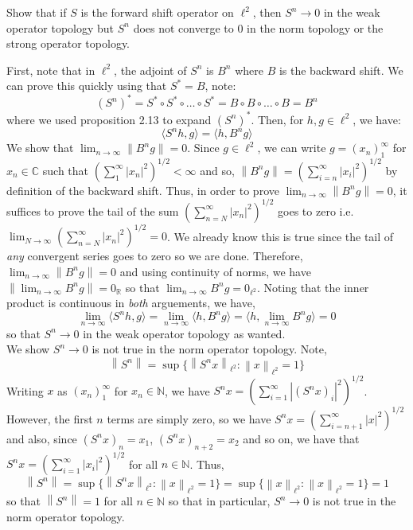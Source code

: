 \documentclass{article}
\newcommand{\norm}[1]{\left\lVert#1\right\rVert}
\begin{document}
    \newpage
    \begin{Exercise}
        Show that if $S$ is the forward shift operator on $\ell^2$, then $S^n\to 0$ in the weak operator topology but $S^n$ does not converge to
        0 in the norm topology or the strong operator topology.
    \end{Exercise}

    \begin{Answer}
        First, note that in $\ell^2$, the adjoint of $S^n$ is $B^n$ where $B$ is the backward shift. 
        We can prove this quickly using that $S^* = B$, note:
        \[ (S^n)^* = S^* \circ S^* \circ \hdots \circ S^* = B \circ B \circ \hdots \circ B = B^n \]
        where we used proposition 2.13 to expand $(S^n)^*$. Then, for $h,g\in\ell^2$, we have:
        \[ \langle S^n h, g\rangle = \langle h, B^n g\rangle \]
        We show that $\lim_{n\to\infty} \norm{B^n g} = 0$. Since $g\in\ell^2$, we can write $g = (x_n)_1^{\infty}$ for $x_n\in\mathbb{C}$
        such that $(\sum_1^{\infty} |x_n|^2)^{1/2} < \infty$ and so, $\norm{B^n g} = (\sum_{i=n}^{\infty} |x_i|^2)^{1/2}$ by definition
        of the backward shift. Thus, in order to prove $\lim_{n\to\infty} \norm{B^ng} = 0$, it suffices to prove the tail of the sum
        $(\sum_{n=N}^{\infty} |x_n|^2)^{1/2}$ goes to zero i.e. $\lim_{N\to\infty} (\sum_{n=N}^{\infty} |x_n|^2)^{1/2} = 0$. 
        We already know this is true since the tail of \textit{any} convergent series goes to zero so we are done. Therefore,
        $\lim_{n\to\infty} \norm{B^n g} = 0$ and using continuity of norms, we have $\norm{\lim_{n\to\infty} B^n g} = 0_{\mathbb{R}}$ so that
        $\lim_{n\to\infty} B^n g = 0_{\ell^2}$. Noting that the inner product is continuous in \textit{both} arguements, we have,
        \[ \lim_{n\to\infty} \langle S^nh,g\rangle = \lim_{n\to\infty} \langle h,B^ng\rangle = \langle h,\lim_{n\to\infty} B^n g\rangle = 0 \]
        so that $S^n \to 0$ in the weak operator topology as wanted.\\

        We show $S^n \to 0$ is not true in the norm operator topology. Note,
        \[ \norm{S^n} = \sup\{\norm{S^n x}_{\ell^2}: \norm{x}_{\ell^2} = 1\} \]
        Writing $x$ as $(x_n)_1^{\infty}$ for $x_n\in\mathbb{N}$, we have $S^nx = (\sum_{i=1}^{\infty} |(S^nx)_i|^2)^{1/2}$. However, the first
        $n$ terms are simply zero, so we have $S^n x = (\sum_{i=n+1}^{\infty} |x|^2)^{1/2}$ and also, since $(S^n x)_n = x_1$,
        $(S^n x)_{n+2} = x_2$ and so on, we have that $S^n x = (\sum_{i=1}^{\infty} |x_i|^2)^{1/2}$ for all $n\in\mathbb{N}$. Thus,
        \[ \norm{S^n} = \sup\{\norm{S^n x}_{\ell^2}: \norm{x}_{\ell^2} = 1\} = \sup\{\norm{x}_{\ell^2}: \norm{x}_{\ell^2} = 1\} = 1 \]
        so that $\norm{S^n} = 1$ for all $n\in\mathbb{N}$ so that in particular, $S^n \to 0$ is not true in the norm operator topology.\\


\end{Answer}
\end{document}
